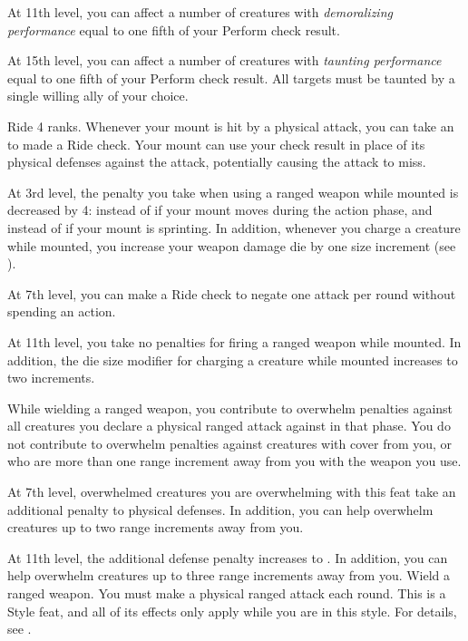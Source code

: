     At 11th level, you can affect a number of creatures with \textit{demoralizing performance} equal to one fifth of your Perform check result.

    At 15th level, you can affect a number of creatures with \textit{taunting performance} equal to one fifth of your Perform check result.
    All targets must be taunted by a single willing ally of your choice.

    \featpre Ride 4 ranks.
    \featben Whenever your mount is hit by a physical attack, you can take an  to made a Ride check.
    Your mount can use your check result in place of its physical defenses against the attack, potentially causing the attack to miss.

    At 3rd level, the penalty you take when using a ranged weapon while mounted is decreased by 4:  instead of  if your mount moves during the action phase, and  instead of  if your mount is sprinting.
    In addition, whenever you charge a creature while mounted, you increase your weapon damage die by one size increment (see ).

    At 7th level, you can make a Ride check to negate one attack per round without spending an action.

    At 11th level, you take no penalties for firing a ranged weapon while mounted.
    In addition, the die size modifier for charging a creature while mounted increases to two increments.

    \featben While wielding a ranged weapon, you contribute to overwhelm penalties against all creatures you declare a physical ranged attack against in that phase.
    You do not contribute to overwhelm penalties against creatures with cover from you, or who are more than one range increment away from you with the weapon you use.

    At 7th level, overwhelmed creatures you are overwhelming with this feat take an additional  penalty to physical defenses.
    In addition, you can help overwhelm creatures up to two range increments away from you.

    At 11th level, the additional defense penalty increases to .
    In addition, you can help overwhelm creatures up to three range increments away from you.
    \stylereq Wield a ranged weapon.
    You must make a physical ranged attack each round.
     This is a Style feat, and all of its effects only apply while you are in this style.
    For details, see .

